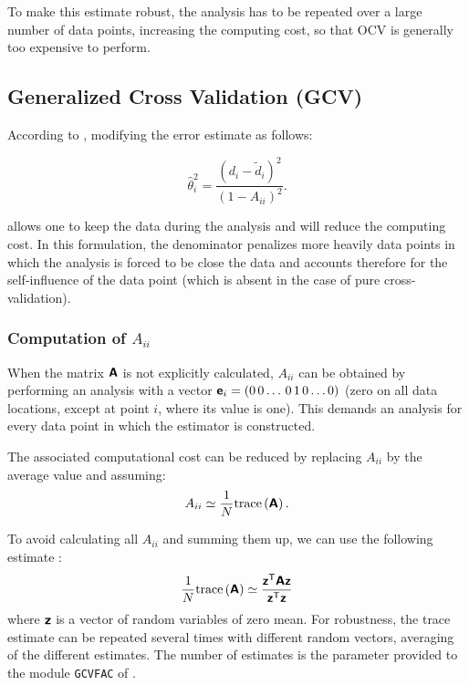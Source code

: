 To make this estimate robust, the analysis has to be repeated over a large number of data points, increasing the computing cost, so that OCV is generally too expensive to perform.


\subsection{Generalized Cross Validation (GCV)}

According to \cite{CRAVEN78}, modifying the error estimate as follows:

\begin{equation}
{\hat{\theta}_i^2} =  \frac{(d_i - \tilde{d}_i)^2}{(1 - A_{ii})^2}.
\label{eq:misfitestimate}
\end{equation}

allows one to keep the data during the analysis and will reduce the computing cost. In this formulation, the denominator penalizes more heavily data points in which the analysis is forced to be close the data and accounts therefore for the self-influence of the data point (which is absent in the case of pure cross-validation).

\subsubsection{Computation of $A_{ii}$}

When the matrix $\mbox{\boldmath $ \protect\mathsf{A} $}$ is not explicitly calculated, $A_{ii}$ can be obtained by performing an analysis with a vector $\mbox{\boldmath $ \protect\mathsf{e} $}_i=(0\,0\ldots\,0\,1\,0\ldots 0)$ (zero on all data locations, except at point $i$, where its value is one). This demands an analysis for every data point in which the estimator is constructed.

The associated computational cost can be reduced by replacing $A_{ii}$ by the average value and assuming:
\begin{equation}
A_{ii} \simeq \frac{1}{N} \mathrm{trace}\left( \mbox{\boldmath $ \protect\mathsf{A} $} \right).
\label{eq:aiitrace}
\end{equation}

To avoid calculating all $A_{ii}$ and summing them up, we can use the following estimate \citep{GIRARD89}:
\begin{equation}
\frac{1}{N} \mathrm{trace}\left( \mbox{\boldmath $ \protect\mathsf{A} $} \right) \simeq  \frac{ {\mbox{\boldmath $ \protect\mathsf{z} $}}^\mathsf{T} \mbox{\boldmath $ \protect\mathsf{A} $} \mbox{\boldmath $ \protect\mathsf{z} $} }{{\mbox{\boldmath $ \protect\mathsf{z} $}}^\mathsf{T} \mbox{\boldmath $ \protect\mathsf{z} $} }
\label{eq:traceest}
\end{equation}
where $\mbox{\boldmath $ \protect\mathsf{z} $}$ is a vector of random variables of zero mean. For robustness, the trace estimate can be repeated several times with different random vectors, averaging of the different estimates. The number of estimates is the parameter provided to the module \texttt{GCVFAC} of \diva.


